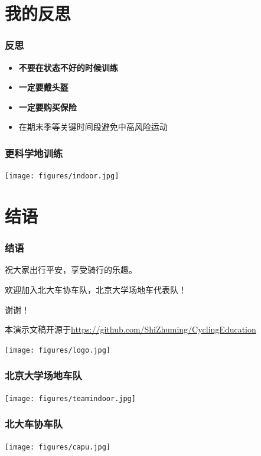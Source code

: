 \documentclass[12pt,AutoFakeBold]{beamer}
\begin{document}
    \section{我的反思}
    \begin{frame}
        \frametitle{反思}
        \begin{itemize}
            \item \textbf{不要在状态不好的时候训练}
            \item \textbf{一定要戴头盔}
            \item \textbf{一定要购买保险}
            \item 在期末季等关键时间段避免中高风险运动
        \end{itemize}
    \end{frame}

    \begin{frame}
        \frametitle{更科学地训练}
    
        \begin{center}
            \texttt{[image: figures/indoor.jpg]}
        \end{center}
    
    \end{frame}

    \section{结语}
    \begin{frame}
        \frametitle{结语}
        祝大家出行平安，享受骑行的乐趣。

        欢迎加入北大车协车队，北京大学场地车代表队！

        谢谢！

        本演示文稿开源于\href{https://github.com/ShiZhuming/CyclingEducation}{https://github.com/ShiZhuming/CyclingEducation}

        \begin{center}
            \texttt{[image: figures/logo.jpg]}
        \end{center}
    \end{frame}

    \begin{frame}
        \frametitle{北京大学场地车队}
    
        \begin{center}
            \texttt{[image: figures/teamindoor.jpg]}
        \end{center}
    
    \end{frame}

    \begin{frame}
        \frametitle{北大车协车队}
    
        \begin{center}
            \texttt{[image: figures/capu.jpg]}
        \end{center}
    
    \end{frame}
\end{document}
